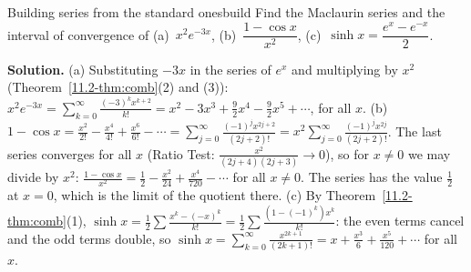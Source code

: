 \documentclass[11pt]{article}
\begin{document}
\begin{exmp}{Building series from the standard ones}{build}
Find the Maclaurin series and the interval of convergence of (a)~$x^2e^{-3x}$, (b)~$\dfrac{1-\cos x}{x^2}$, (c)~$\sinh x=\dfrac{e^x-e^{-x}}2$.

\textbf{Solution.} (a) Substituting $-3x$ in the series of $e^x$ and multiplying by $x^2$ (Theorem~\ref{11.2-thm:comb}(2) and (3)): $x^2e^{-3x}=\sum_{k=0}^\infty\frac{(-3)^kx^{k+2}}{k!}=x^2-3x^3+\frac92x^4-\frac92x^5+\cdots$, for all $x$.
(b) $1-\cos x=\frac{x^2}{2!}-\frac{x^4}{4!}+\frac{x^6}{6!}-\cdots=\sum_{j=0}^\infty\frac{(-1)^jx^{2j+2}}{(2j+2)!}=x^2\sum_{j=0}^\infty\frac{(-1)^jx^{2j}}{(2j+2)!}$. The last series converges for all $x$ (Ratio Test: $\frac{x^2}{(2j+4)(2j+3)}\to0$), so for $x\ne0$ we may divide by $x^2$: $\frac{1-\cos x}{x^2}=\frac12-\frac{x^2}{24}+\frac{x^4}{720}-\cdots$ for all $x\ne0$. The series has the value $\frac12$ at $x=0$, which is the limit of the quotient there.
(c) By Theorem~\ref{11.2-thm:comb}(1), $\sinh x=\frac12\sum\frac{x^k-(-x)^k}{k!}=\frac12\sum\frac{(1-(-1)^k)x^k}{k!}$: the even terms cancel and the odd terms double, so $\sinh x=\sum_{k=0}^\infty\frac{x^{2k+1}}{(2k+1)!}=x+\frac{x^3}6+\frac{x^5}{120}+\cdots$ for all $x$.
\end{exmp}
\end{document}

